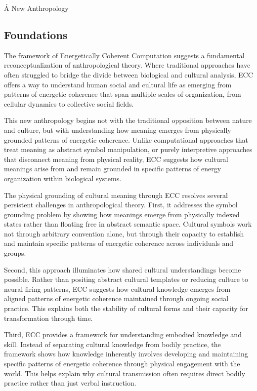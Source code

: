 \h{A New Anthropology}

\begin{refsection}

\section{Foundations}

The framework of Energetically Coherent Computation suggests a fundamental reconceptualization of anthropological theory. Where traditional approaches have often struggled to bridge the divide between biological and cultural analysis, ECC offers a way to understand human social and cultural life as emerging from patterns of energetic coherence that span multiple scales of organization, from cellular dynamics to collective social fields.

This new anthropology begins not with the traditional opposition between nature and culture, but with understanding how meaning emerges from physically grounded patterns of energetic coherence. Unlike computational approaches that treat meaning as abstract symbol manipulation, or purely interpretive approaches that disconnect meaning from physical reality, ECC suggests how cultural meanings arise from and remain grounded in specific patterns of energy organization within biological systems.

The physical grounding of cultural meaning through ECC resolves several persistent challenges in anthropological theory. First, it addresses the symbol grounding problem by showing how meanings emerge from physically indexed states rather than floating free in abstract semantic space. Cultural symbols work not through arbitrary convention alone, but through their capacity to establish and maintain specific patterns of energetic coherence across individuals and groups.

Second, this approach illuminates how shared cultural understandings become possible. Rather than positing abstract cultural templates or reducing culture to neural firing patterns, ECC suggests how cultural knowledge emerges from aligned patterns of energetic coherence maintained through ongoing social practice. This explains both the stability of cultural forms and their capacity for transformation through time.

Third, ECC provides a framework for understanding embodied knowledge and skill. Instead of separating cultural knowledge from bodily practice, the framework shows how knowledge inherently involves developing and maintaining specific patterns of energetic coherence through physical engagement with the world. This helps explain why cultural transmission often requires direct bodily practice rather than just verbal instruction.


\end{refsection}
